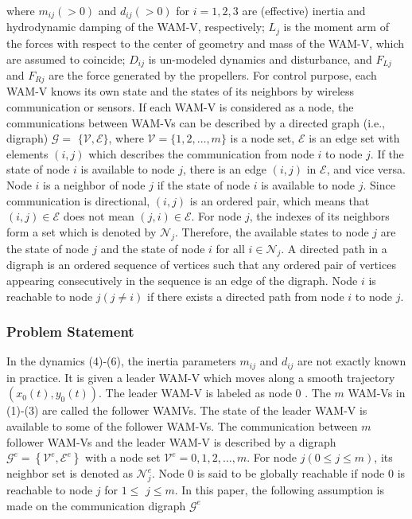 \documentclass[10pt]{article}
\begin{document}
where $m_{i j}(>0)$ and $d_{i j}(>0)$ for $i=1,2,3$ are (effective) inertia and hydrodynamic damping of the WAM-V, respectively; $L_{j}$ is the moment arm of the forces with respect to the center of geometry and mass of the WAM-V, which are assumed to coincide; $D_{i j}$ is un-modeled dynamics and disturbance, and $F_{L j}$ and $F_{R j}$ are the force generated by the propellers. For control purpose, each WAM-V knows its own state and the states of its neighbors by wireless communication or sensors. If each WAM-V is considered as a node, the communications between WAM-Vs can be described by a directed graph (i.e., digraph) $\mathcal{G}=$ $\{\mathcal{V}, \mathcal{E}\}$, where $\mathcal{V}=\{1,2, \ldots, m\}$ is a node set, $\mathcal{E}$ is an edge set with elements $(i, j)$ which describes the communication from node $i$ to node $j$. If the state of node $i$ is available to node $j$, there is an edge $(i, j)$ in $\mathcal{E}$, and vice versa. Node $i$ is a neighbor of node $j$ if the state of node $i$ is available to node $j$. Since communication is directional, $(i, j)$ is an ordered pair, which means that $(i, j) \in \mathcal{E}$ does not mean $(j, i) \in \mathcal{E}$. For node $j$, the indexes of its neighbors form a set which is denoted by $\mathcal{N}_{j}$. Therefore, the available states to node $j$ are the state of node $j$ and the state of node $i$ for all $i \in \mathcal{N}_{j}$. A directed path in a digraph is an ordered sequence of vertices such that any ordered pair of vertices appearing consecutively in the sequence is an edge of the digraph. Node $i$ is reachable to node $j(j \neq i)$ if there exists a directed path from node $i$ to node $j$.

\subsubsection{Problem Statement}
In the dynamics (4)-(6), the inertia parameters $m_{i j}$ and $d_{i j}$ are not exactly known in practice. It is given a leader WAM-V which moves along a smooth trajectory $\left(x_{0}(t), y_{0}(t)\right)$. The leader WAM-V is labeled as node 0 . The $m$ WAM-Vs in (1)-(3) are called the follower WAMVs. The state of the leader WAM-V is available to some of the follower WAM-Vs. The communication between $m$ follower WAM-Vs and the leader WAM-V is described by a digraph $\mathcal{G}^{e}=\left\{\mathcal{V}^{e}, \mathcal{E}^{e}\right\}$ with a node set $\mathcal{V}^{e}=0,1,2, \ldots, m$. For node $j(0 \leq j \leq m)$, its neighbor set is denoted as $\mathcal{N}_{j}^{e}$. Node 0 is said to be globally reachable if node 0 is reachable to node $j$ for $1 \leq$ $j \leq m$. In this paper, the following assumption is made on the communication digraph $\mathcal{G}^{e}$
\end{document}
